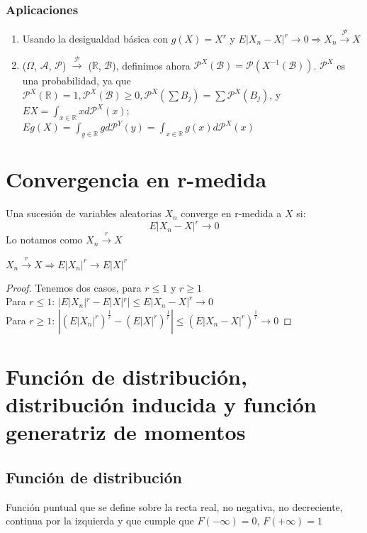 \documentclass[12pt,a4paper]{book}
\begin{document}
\subsubsection{Aplicaciones}
\begin{enumerate}
\item Usando la desigualdad básica con $g(X) = X^r$ y $E|X_n - X|^r \to 0 \Rightarrow X_n \stackrel{\mathcal{P}}{\rightarrow} X$
\item ($\Omega$, $\mathcal{A}$, $\mathcal{P}$) $\stackrel{\mathcal{P}}{\rightarrow}$ ($\mathbb{R}$, $\mathcal{B}$), definimos ahora $\mathcal{P}^X(\mathcal{B}) = \mathcal{P}(X^{-1}(\mathcal{B}))$. $\mathcal{P}^X$ es una probabilidad, ya que $\mathcal{P}^X(\mathbb{R}) = 1, \mathcal{P}^X(\mathcal{B}) \geq 0, \mathcal{P}^X(\sum B_j) = \sum \mathcal{P}^X(B_j)$, y $EX = \displaystyle \int_{x \in \mathbb{R}} x d \mathcal{P}^X(x)$; $Eg(X) = \displaystyle \int_{y \in \mathbb{R}} g d \mathcal{P}^Y(y) = \displaystyle \int_{x \in \mathbb{R}} g(x) d \mathcal{P}^X(x)$
\end{enumerate}

\section{Convergencia en r-medida}
Una sucesión de variables aleatorias $X_n$ converge en r-medida a $X$ si:
$$ E|X_n - X|^r \to 0$$
Lo notamos como $X_n \stackrel{r}{\rightarrow} X$

\begin{lemma}
$X_n \stackrel{r}{\rightarrow} X \Rightarrow E|X_n|^r \rightarrow E|X|^r$
\end{lemma}

\begin{proof}
Tenemos dos casos, para $r \leq 1$ y $r \geq 1$\\

Para $r \leq 1$: $|E|X_n|^r - E|X|^r| \leq E|X_n - X|^r \rightarrow 0$\\

Para $r \geq 1$: $|(E|X_n|^r)^{\frac{1}{r}} - (E|X|^r)^{\frac{1}{r}}| \leq (E|X_n - X|^r)^{\frac{1}{r}} \rightarrow 0$
\end{proof}

\section{Función de distribución, distribución inducida y función generatriz de momentos}
\subsection{Función de distribución}
Función puntual que se define sobre la recta real, no negativa, no decreciente, continua por la izquierda y que cumple que $F(-\infty) = 0$, $F(+\infty) = 1$\\
\end{document}
